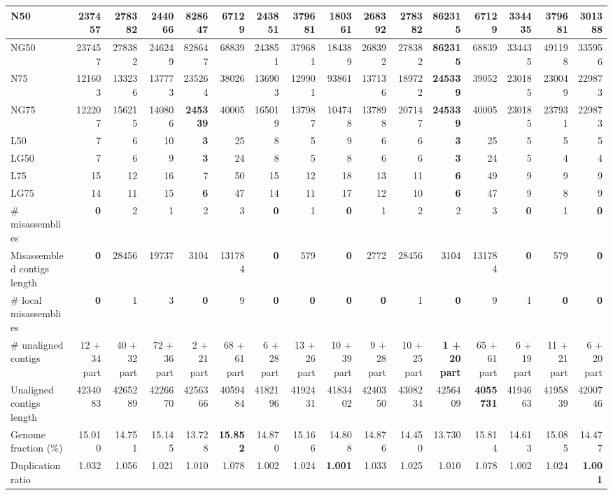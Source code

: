 \documentclass[12pt,a4paper]{article}
\begin{document}
\begin{table}[ht]
\begin{center}
\begin{tabular}{|l*{15}{|r}|}
N50 & 237457 & 278382 & 244066 & 828647 & 67129 & 243851 & 379681 & 180361 & 268392 & 278382 & {\bf 862315} & 67129 & 334435 & 379681 & 301388 \\ \hline
NG50 & 237457 & 278382 & 246249 & 828647 & 68839 & 243851 & 379681 & 184389 & 268392 & 278382 & {\bf 862315} & 68839 & 334435 & 491198 & 335956 \\ \hline
N75 & 121603 & 133236 & 137773 & 235264 & 38026 & 136903 & 129901 & 93861 & 137136 & 189722 & {\bf 245339} & 39052 & 230185 & 230049 & 229873 \\ \hline
NG75 & 122207 & 156215 & 140806 & {\bf 245339} & 40005 & 165019 & 137987 & 104748 & 137898 & 207147 & {\bf 245339} & 40005 & 230185 & 237931 & 229873 \\ \hline
L50 & 7 & 6 & 10 & {\bf 3} & 25 & 8 & 5 & 9 & 6 & 6 & {\bf 3} & 25 & 5 & 5 & 5 \\ \hline
LG50 & 7 & 6 & 9 & {\bf 3} & 24 & 8 & 5 & 8 & 6 & 6 & {\bf 3} & 24 & 5 & 4 & 4 \\ \hline
L75 & 15 & 12 & 16 & 7 & 50 & 15 & 12 & 18 & 13 & 11 & {\bf 6} & 49 & 9 & 9 & 9 \\ \hline
LG75 & 14 & 11 & 15 & {\bf 6} & 47 & 14 & 11 & 17 & 12 & 10 & {\bf 6} & 47 & 9 & 8 & 9 \\ \hline
\# misassemblies & {\bf 0} & 2 & 1 & 2 & 3 & {\bf 0} & 1 & {\bf 0} & 1 & 2 & 2 & 3 & {\bf 0} & 1 & {\bf 0} \\ \hline
Misassembled contigs length & {\bf 0} & 28456 & 19737 & 3104 & 131784 & {\bf 0} & 579 & {\bf 0} & 2772 & 28456 & 3104 & 131784 & {\bf 0} & 579 & {\bf 0} \\ \hline
\# local misassemblies & {\bf 0} & 1 & 3 & {\bf 0} & 9 & {\bf 0} & {\bf 0} & {\bf 0} & {\bf 0} & 1 & {\bf 0} & 9 & 1 & {\bf 0} & {\bf 0} \\ \hline
\# unaligned contigs & 12 + 34 part & 40 + 32 part & 72 + 36 part & 2 + 21 part & 68 + 61 part & 6 + 28 part & 13 + 26 part & 10 + 39 part & 9 + 28 part & 10 + 25 part & {\bf 1 + 20 part} & 65 + 61 part & 6 + 19 part & 11 + 21 part & 6 + 20 part \\ \hline
Unaligned contigs length & 4234083 & 4265289 & 4226670 & 4256366 & 4059484 & 4182196 & 4192431 & 4183402 & 4240350 & 4308234 & 4256409 & {\bf 4055731} & 4194663 & 4195839 & 4200746 \\ \hline
Genome fraction (\%) & 15.010 & 14.751 & 15.145 & 13.728 & {\bf 15.852} & 14.870 & 15.166 & 14.808 & 14.876 & 14.450 & 13.730 & 15.814 & 14.613 & 15.085 & 14.477 \\ \hline
Duplication ratio & 1.032 & 1.056 & 1.021 & 1.010 & 1.078 & 1.002 & 1.024 & {\bf 1.001} & 1.033 & 1.025 & 1.010 & 1.078 & 1.002 & 1.024 & {\bf 1.001} \\ \hline

\end{tabular}
\end{center}
\end{table}
\end{document}

